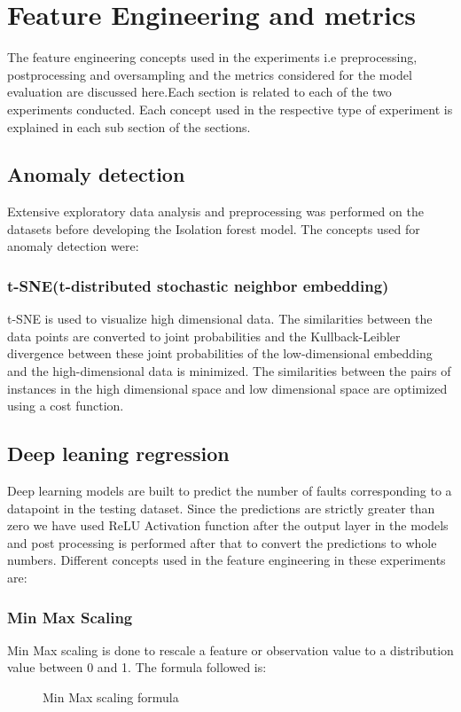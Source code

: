 \chapter{Feature Engineering and metrics}\label{final}

The feature engineering concepts used in the experiments i.e preprocessing, postprocessing and oversampling and the metrics considered for the model evaluation are discussed here.Each section is related to each of the two experiments conducted.
Each concept used in the respective type of experiment is explained in each sub section of the sections.

\section{Anomaly detection}
Extensive exploratory data analysis and preprocessing was performed on the datasets before developing the Isolation forest model. The concepts used for anomaly detection were:

\subsection{t-SNE(t-distributed stochastic neighbor embedding)}
t-SNE is used to visualize high dimensional data. The similarities between the data points are converted to joint probabilities and the Kullback-Leibler divergence between these joint probabilities of the low-dimensional embedding and the high-dimensional data is minimized. The similarities between the pairs of instances in the high dimensional space and low dimensional space are optimized using a cost function.

\section{Deep leaning regression}
Deep learning models are built to predict the number of faults corresponding to a datapoint in the testing dataset. Since the predictions are strictly greater than zero we have used ReLU Activation function after the output layer in the models and post processing is performed after that to convert the predictions to whole numbers. Different concepts used in the feature engineering in these experiments are:

\subsection{Min Max Scaling}
Min Max scaling is done to rescale a feature or observation value to a distribution value between 0 and 1. The formula followed is:
 \begin{figure}
%
  \caption{Min Max scaling formula}
  \label{fig:key}
\end{figure}

